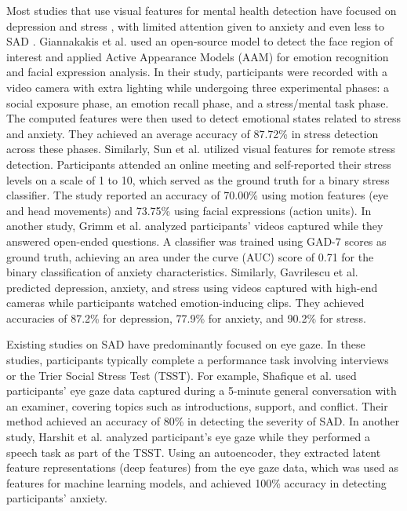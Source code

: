 Most studies that use visual features for mental health detection have focused on depression and stress \cite{cohn2009detecting, schuller2011avec, valstar2014avec, ringeval2019avec, ringeval2017avec, valstar2016avec, valstar2013avec, wang2021multimodal, gavrilescu2019predicting, grimm2022phq, giannakakis2017stress, sun2022estimating}, with limited attention given to anxiety \cite{wang2021multimodal, gavrilescu2019predicting, grimm2022phq, mo2024multimodal, giannakakis2017stress} and even less to SAD \cite{harshit2024eyes, shafique2022towards}. Giannakakis et al. \cite{giannakakis2017stress} used an open-source model to detect the face region of interest and applied Active Appearance Models (AAM) for emotion recognition and facial expression analysis. In their study, participants were recorded with a video camera with extra lighting while undergoing three experimental phases: a social exposure phase, an emotion recall phase, and a stress/mental task phase. The computed features were then used to detect emotional states related to stress and anxiety. They achieved an average accuracy of 87.72\% in stress detection across these phases. Similarly, Sun et al. \cite{sun2022estimating} utilized visual features for remote stress detection. Participants attended an online meeting and self-reported their stress levels on a scale of 1 to 10, which served as the ground truth for a binary stress classifier. The study reported an accuracy of 70.00\% using motion features (eye and head movements) and 73.75\% using facial expressions (action units). In another study, Grimm et al. \cite{grimm2022phq} analyzed participants’ videos captured while they answered open-ended questions. A classifier was trained using GAD-7 scores as ground truth, achieving an area under the curve (AUC) score of 0.71 for the binary classification of anxiety characteristics. Similarly, Gavrilescu et al. \cite{gavrilescu2019predicting} predicted depression, anxiety, and stress using videos captured with high-end cameras while participants watched emotion-inducing clips. They achieved accuracies of 87.2\% for depression, 77.9\% for anxiety, and 90.2\% for stress.

Existing studies on SAD have predominantly focused on eye gaze. In these studies, participants typically complete a performance task involving interviews or the Trier Social Stress Test (TSST). For example, Shafique et al. \cite{shafique2022towards} used participants' eye gaze data captured during a 5-minute general conversation with an examiner, covering topics such as introductions, support, and conflict. Their method achieved an accuracy of 80\% in detecting the severity of SAD. In another study, Harshit et al. \cite{harshit2024eyes} analyzed participant's eye gaze while they performed a speech task as part of the TSST. Using an autoencoder, they extracted latent feature representations (deep features) from the eye gaze data, which was used as features for machine learning models, and achieved 100\% accuracy in detecting participants' anxiety.

